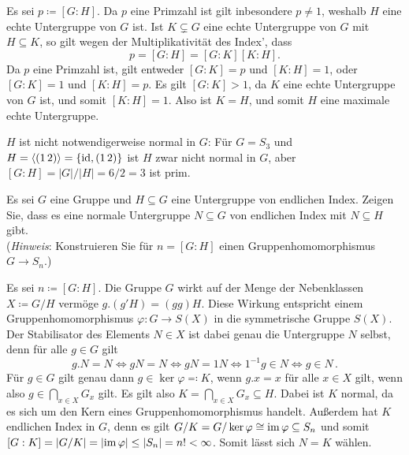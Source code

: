 \begin{solution}
  Es sei $p \coloneqq [G : H]$.
  Da $p$ eine Primzahl ist gilt inbesondere $p \neq 1$, weshalb $H$ eine echte Untergruppe von $G$ ist.
  Ist $K \subsetneq G$ eine echte Untergruppe von $G$ mit $H \subseteq K$, so gilt wegen der Multiplikativität des Index’, dass 
  \[
      p
    = [G : H]
    = [G : K] [K : H].
  \]
  Da $p$ eine Primzahl ist, gilt entweder $[G : K] = p$ und $[K : H] = 1$, oder $[G : K] = 1$ und $[K : H] = p$.
  Es gilt $[G : K] > 1$, da $K$ eine echte Untergruppe von $G$ ist, und somit $[K : H] = 1$.
  Also ist $K = H$, und somit $H$ eine maximale echte Untergruppe.
  
  $H$ ist nicht notwendigerweise normal in $G$:
  Für $G = S_3$ und $H = \langle(1\,2)\rangle = \{\operatorname{id}, (1\,2)\}$ ist $H$ zwar nicht normal in $G$, aber $[G : H] = |G|/|H| = 6/2 = 3$ ist prim.
\end{solution}


\begin{question}[subtitle = {Untergruppen vom endlichen Index}]
  Es sei $G$ eine Gruppe und $H \subseteq G$ eine Untergruppe von endlichen Index.
  Zeigen Sie, dass es eine normale Untergruppe $N \subseteq G$ von endlichen Index mit $N \subseteq H$ gibt. \\
  (\emph{Hinweis}: Konstruieren Sie für $n = [G : H]$ einen Gruppenhomomorphismus $G \to S_n$.)
\end{question}


\begin{solution}
  Es sei $n \coloneqq [G : H]$.
  Die Gruppe $G$ wirkt auf der Menge der Nebenklassen $X \coloneqq G/H$ vermöge $g.(g'H) = (gg)H$.
  Diese Wirkung entspricht einem Gruppenhomomorphismus $\varphi \colon G \to S(X)$ in die symmetrische Gruppe $S(X)$.
  Der Stabilisator des Elements $N \in X$ ist dabei genau die Untergruppe $N$ selbst, denn für alle $g \in G$ gilt
  \[
          g.N = N
    \iff  gN = N
    \iff  gN = 1N
    \iff  1^{-1} g \in N
    \iff  g \in N \,.
  \]
  Für $g \in G$ gilt genau dann $g \in \ker \varphi \eqqcolon K$, wenn $g.x = x$ für alle $x \in X$ gilt, wenn also $g \in \bigcap_{x \in X} G_x$ gilt.
  Es gilt also $K = \bigcap_{x \in X} G_x \subseteq H$.
  Dabei ist $K$ normal, da es sich um den Kern eines Gruppenhomomorphismus handelt.
  Außerdem hat $K$ endlichen Index in $G$, denn es gilt $G/K = G/\ker \varphi \cong \operatorname{im} \varphi \subseteq S_n$ und somit $[G : K] = |G/K| = |{\operatorname{im} \varphi}| \leq |S_n| = n! < \infty$.
  Somit lässt sich $N = K$ wählen.
\end{solution}


